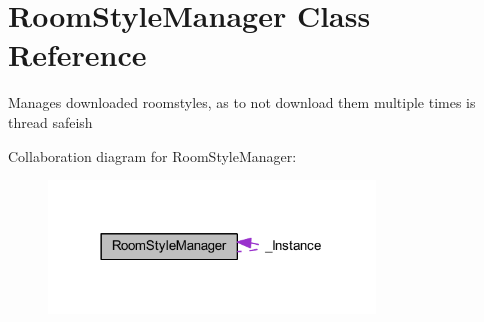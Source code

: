 \hypertarget{class_room_style_manager}{}\section{Room\+Style\+Manager Class Reference}
\label{class_room_style_manager}


Manages downloaded roomstyles, as to not download them multiple times is thread safeish  




Collaboration diagram for Room\+Style\+Manager\+:
\nopagebreak
\begin{figure}[H]
\begin{center}
\leavevmode
\includegraphics[width=246pt]{class_room_style_manager__coll__graph}
\end{center}
\end{figure}
